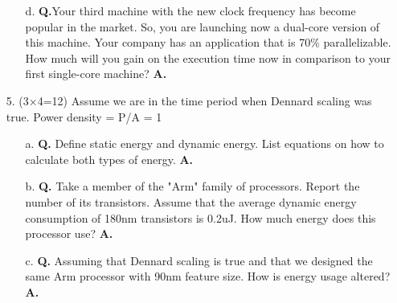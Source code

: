 \documentclass[main.tex]{subfiles}
\begin{document}
\begin{enumerate}
\begin{enumerate}
        \item [d.] \textbf{Q.}Your third machine with the new clock frequency has become popular in the market. So, you are launching now a dual-core version of this machine. Your company has an application that is 70\% parallelizable. How much will you gain on the execution time now in comparison to your first single-core machine? \textbf{A.}
    \end{enumerate}

    \item [5.] (3×4=12) Assume we are in the time period when Dennard scaling was true. Power density = P/A = 1

    \begin{enumerate}
        \item [a.] \textbf{Q.} Define static energy and dynamic energy. List equations on how to calculate both types of energy. \textbf{A.}

        \item [b.] \textbf{Q.} Take a member of the "Arm" family of processors. Report the number of its transistors. Assume that the average dynamic energy consumption of 180nm transistors is 0.2uJ. How much energy does this processor use? \textbf{A.}
        
        \item [c.] \textbf{Q.} Assuming that Dennard scaling is true and that we designed the same Arm processor with 90nm feature size. How is energy usage altered? \textbf{A.}
    \end{enumerate}
    
\end{enumerate}
\end{document}
